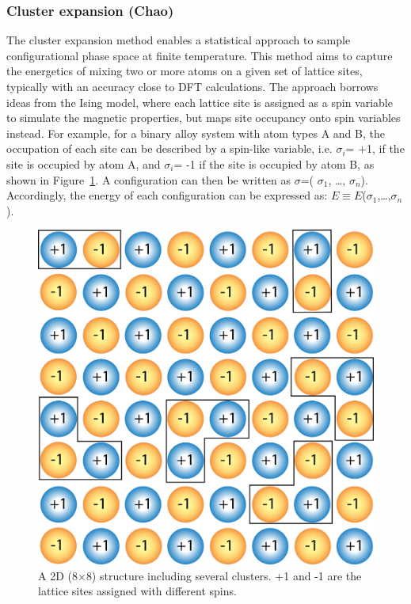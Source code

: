 \documentclass[../main.tex]{subfiles}
\begin{document}
\subsubsection{Cluster expansion (Chao)}
\label{sec:cluster_expansion}
The cluster expansion method enables a statistical approach to sample configurational phase space at finite temperature.\cite{sanchez1984generalized,de1994cluster,blum2004mixed} This method aims to capture the energetics of mixing two or more atoms on a given set of lattice sites, typically with an accuracy close to DFT calculations. The approach borrows ideas from the Ising model\cite{gallavotti2013statistical}, where each lattice site is assigned as a spin variable to simulate the magnetic properties, but maps site occupancy onto spin variables instead.\cite{persson2010} For example, for a binary alloy system with atom types A and B, the occupation of each site can be described by a spin-like variable, i.e. $\sigma_i$= +1, if the site is occupied by atom A, and $\sigma_i$= -1 if the site is occupied by atom B, as shown in Figure~\ref{fig:cluster}. A configuration can then be written as $\sigma$=( $\sigma_1$, …, $\sigma_n$). Accordingly, the energy of each configuration can be expressed as: $E\equiv E$($\sigma_1$,…,$\sigma_n$).

\begin{figure}
    \centering
    \includegraphics[scale=0.5]{figures/clusters.png}
    \caption{A 2D (8$\times$8) structure including several clusters. +1 and -1 are the lattice sites assigned with different spins.}
    \label{fig:cluster}
\end{figure}
\end{document}
